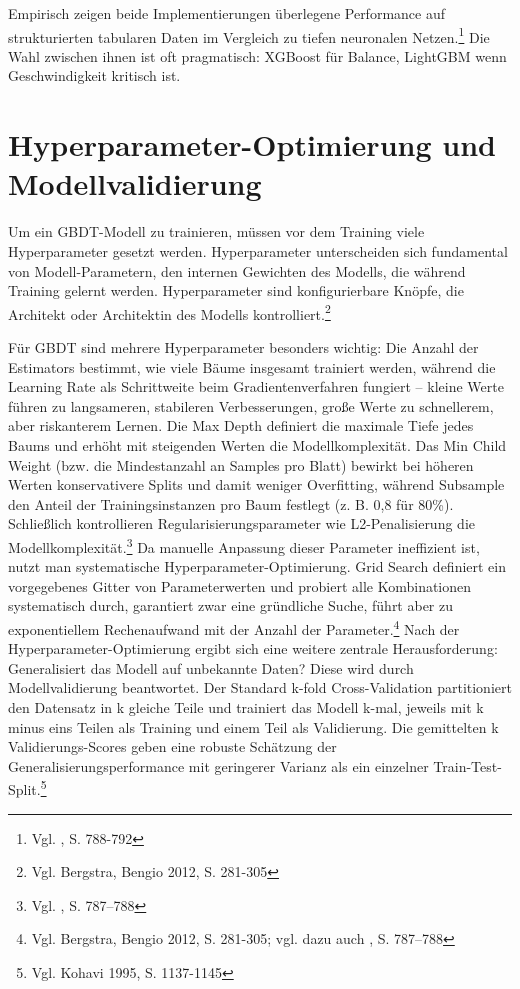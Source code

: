 Empirisch zeigen beide Implementierungen überlegene Performance auf strukturierten tabularen Daten im Vergleich zu tiefen neuronalen Netzen.\footnote{Vgl. \cite{Chen2016}, S. 788-792} Die Wahl zwischen ihnen ist oft pragmatisch: XGBoost für Balance, LightGBM wenn Geschwindigkeit kritisch ist.



\section{Hyperparameter-Optimierung und Modellvalidierung}

Um ein GBDT-Modell zu trainieren, müssen vor dem Training viele Hyperparameter gesetzt werden. Hyperparameter unterscheiden sich fundamental von Modell-Parametern, den internen Gewichten des Modells, die während Training gelernt werden. Hyperparameter sind konfigurierbare Knöpfe, die Architekt oder Architektin des Modells kontrolliert.\footnote{Vgl. Bergstra, Bengio 2012, S. 281-305}

Für GBDT sind mehrere Hyperparameter besonders wichtig: Die Anzahl der Estimators bestimmt, wie viele Bäume insgesamt trainiert werden, während die Learning Rate als Schrittweite beim Gradientenverfahren fungiert – kleine Werte führen zu langsameren, stabileren Verbesserungen, große Werte zu schnellerem, aber riskanterem Lernen. Die Max Depth definiert die maximale Tiefe jedes Baums und erhöht mit steigenden Werten die Modellkomplexität. Das Min Child Weight (bzw. die Mindestanzahl an Samples pro Blatt) bewirkt bei höheren Werten konservativere Splits und damit weniger Overfitting, während Subsample den Anteil der Trainingsinstanzen pro Baum festlegt (z. B. 0{,}8 für 80\%). Schließlich kontrollieren Regularisierungsparameter wie L2-Penalisierung die Modellkomplexität.\footnote{Vgl. \cite{Chen2016}, S. 787–788}
Da manuelle Anpassung dieser Parameter ineffizient ist, nutzt man systematische Hyperparameter-Optimierung. Grid Search definiert ein vorgegebenes Gitter von Parameterwerten und probiert alle Kombinationen systematisch durch, garantiert zwar eine gründliche Suche, führt aber zu exponentiellem Rechenaufwand mit der Anzahl der Parameter.\footnote{Vgl. Bergstra, Bengio 2012, S. 281-305; vgl. dazu auch \cite{Chen2016}, S. 787–788}
Nach der Hyperparameter-Optimierung ergibt sich eine weitere zentrale Herausforderung: Generalisiert das Modell auf unbekannte Daten? Diese wird durch Modellvalidierung beantwortet. Der Standard k-fold Cross-Validation partitioniert den Datensatz in k gleiche Teile und trainiert das Modell k-mal, jeweils mit k minus eins Teilen als Training und einem Teil als Validierung. Die gemittelten k Validierungs-Scores geben eine robuste Schätzung der Generalisierungsperformance mit geringerer Varianz als ein einzelner Train-Test-Split.\footnote{Vgl. Kohavi 1995, S. 1137-1145}

